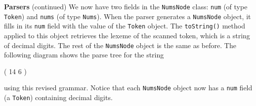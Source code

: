 \begin{minipage}[t]{\sw}
\slidenumber
\LARGE
{\bf Parsers} (continued)\exx
\Large
\emm{\Large\NormalBox{\MYlonGrammarTOK}}\exx
We now have two fields in the \verb'NumsNode' class:
\verb'num' (of type \verb'Token')
and \verb'nums' (of type \verb'Nums').
When the parser generates a \verb'NumsNode' object,
it fills in its \verb'num' field
with the value of the \verb'Token' object.
The \verb'toString()' method applied to this object
retrieves the lexeme of the scanned token,
which is a string of decimal digits.
The rest of the \verb'NumsNode' object is the same as before.\exx
The following diagram shows the parse tree for the string
\begin{qv}
( 14 6 )
\end{qv}
using this revised grammar. Notice that each \verb'NumsNode' object
now has a \verb'num' field (a \verb'Token') containing decimal digits.\exx
\centerline{}
\end{minipage}
\clearpage

